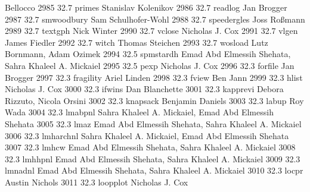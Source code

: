                                    Bellocco                                
  2985     32.7    primes        Stanislav Kolenikov                     
  2986     32.7    readlog       Jan Brogger                             
  2987     32.7    smwoodbury    Sam Schulhofer-Wohl                     
  2988     32.7    speedergles   Joss Roßmann                           
  2989     32.7    textgph       Nick Winter                             
  2990     32.7    vclose        Nicholas J. Cox                         
  2991     32.7    vlgen         James Fiedler                           
  2992     32.7    witch         Thomas Steichen                         
  2993     32.7    wosload       Lutz Bornmann, Adam Ozimek              
  2994     32.5    spmstardh     Emad Abd Elmessih Shehata, Sahra        
                                   Khaleel A. Mickaiel                     
  2995     32.5    pexp          Nicholas J. Cox                         
  2996     32.3    forfile       Jan Brogger                             
  2997     32.3    fragility     Ariel Linden                            
  2998     32.3    fview         Ben Jann                                
  2999     32.3    hlist         Nicholas J. Cox                         
  3000     32.3    ifwins        Dan Blanchette                          
  3001     32.3    kapprevi      Debora Rizzuto, Nicola Orsini           
  3002     32.3    knapsack      Benjamin Daniels                        
  3003     32.3    labup         Roy Wada                                
  3004     32.3    lmabpnl       Sahra Khaleel A. Mickaiel, Emad Abd     
                                   Elmessih Shehata                        
  3005     32.3    lmaz          Emad Abd Elmessih Shehata, Sahra        
                                   Khaleel A. Mickaiel                     
  3006     32.3    lmharchnl     Sahra Khaleel A. Mickaiel, Emad Abd     
                                   Elmessih Shehata                        
  3007     32.3    lmhcw         Emad Abd Elmessih Shehata, Sahra        
                                   Khaleel A. Mickaiel                     
  3008     32.3    lmhhpnl       Emad Abd Elmessih Shehata, Sahra        
                                   Khaleel A. Mickaiel                     
  3009     32.3    lmnadnl       Emad Abd Elmessih Shehata, Sahra        
                                   Khaleel A. Mickaiel                     
  3010     32.3    locpr         Austin Nichols                          
  3011     32.3    loopplot      Nicholas J. Cox                         
